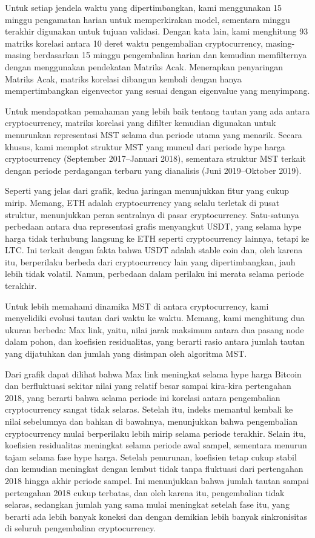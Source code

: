 \documentclass[12pt,a4paper]{article}
\begin{document}
Untuk setiap jendela waktu yang dipertimbangkan, kami menggunakan 15 minggu pengamatan harian untuk memperkirakan model, sementara minggu terakhir digunakan untuk tujuan validasi. Dengan kata lain, kami menghitung 93 matriks korelasi antara 10 deret waktu pengembalian cryptocurrency, masing-masing berdasarkan 15 minggu pengembalian harian dan kemudian memfilternya dengan menggunakan pendekatan Matriks Acak. Menerapkan penyaringan Matriks Acak, matriks korelasi dibangun kembali dengan hanya mempertimbangkan eigenvector yang sesuai dengan eigenvalue yang menyimpang.

Untuk mendapatkan pemahaman yang lebih baik tentang tautan yang ada antara cryptocurrency, matriks korelasi yang difilter kemudian digunakan untuk menurunkan representasi MST selama dua periode utama yang menarik. Secara khusus, kami memplot struktur MST yang muncul dari periode hype harga cryptocurrency (September 2017–Januari 2018), sementara struktur MST terkait dengan periode perdagangan terbaru yang dianalisis (Juni 2019–Oktober 2019).

Seperti yang jelas dari grafik, kedua jaringan menunjukkan fitur yang cukup mirip. Memang, ETH adalah cryptocurrency yang selalu terletak di pusat struktur, menunjukkan peran sentralnya di pasar cryptocurrency. Satu-satunya perbedaan antara dua representasi grafis menyangkut USDT, yang selama hype harga tidak terhubung langsung ke ETH seperti cryptocurrency lainnya, tetapi ke LTC. Ini terkait dengan fakta bahwa USDT adalah stable coin dan, oleh karena itu, berperilaku berbeda dari cryptocurrency lain yang dipertimbangkan, jauh lebih tidak volatil. Namun, perbedaan dalam perilaku ini merata selama periode terakhir.

Untuk lebih memahami dinamika MST di antara cryptocurrency, kami menyelidiki evolusi tautan dari waktu ke waktu. Memang, kami menghitung dua ukuran berbeda: Max link, yaitu, nilai jarak maksimum antara dua pasang node dalam pohon, dan koefisien residualitas, yang berarti rasio antara jumlah tautan yang dijatuhkan dan jumlah yang disimpan oleh algoritma MST. 

Dari grafik dapat dilihat bahwa Max link meningkat selama hype harga Bitcoin dan berfluktuasi sekitar nilai yang relatif besar sampai kira-kira pertengahan 2018, yang berarti bahwa selama periode ini korelasi antara pengembalian cryptocurrency sangat tidak selaras. Setelah itu, indeks memantul kembali ke nilai sebelumnya dan bahkan di bawahnya, menunjukkan bahwa pengembalian cryptocurrency mulai berperilaku lebih mirip selama periode terakhir. Selain itu, koefisien residualitas meningkat selama periode awal sampel, sementara menurun tajam selama fase hype harga. Setelah penurunan, koefisien tetap cukup stabil dan kemudian meningkat dengan lembut tidak tanpa fluktuasi dari pertengahan 2018 hingga akhir periode sampel. Ini menunjukkan bahwa jumlah tautan sampai pertengahan 2018 cukup terbatas, dan oleh karena itu, pengembalian tidak selaras, sedangkan jumlah yang sama mulai meningkat setelah fase itu, yang berarti ada lebih banyak koneksi dan dengan demikian lebih banyak sinkronisitas di seluruh pengembalian cryptocurrency.
\end{document}
